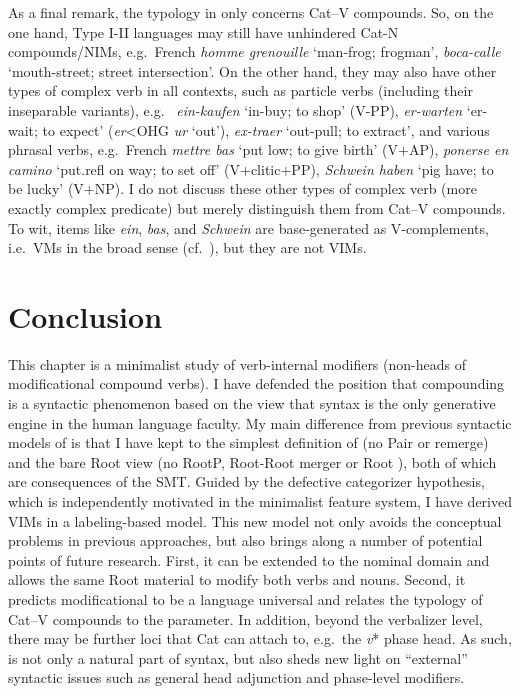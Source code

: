 \documentclass[output=paper]{langsci/langscibook}
\begin{document}
As a final remark, the typology in  only concerns Cat--V
compounds. So, on the one hand, Type I-II languages may still have unhindered
Cat-N compounds/N\glspl{IM}, e.g.\ French {\it homme grenouille} `man-frog;
frogman',  {\it boca-calle} `mouth-street; street intersection'. On the
other hand, they may also have other types of complex verb in all contexts,
such as particle verbs (including their inseparable variants), e.g.\ 
{\it ein-kaufen} `in-buy; to shop' (V-PP), {\it er-warten} `{\sc er}-wait; to
expect' ({\it er}<OHG {\it ur} `out'),  {\it ex-traer} `out-pull; to
extract', and various phrasal verbs, e.g.\ French {\it mettre bas} `put low; to
give birth' (V+AP),  {\it ponerse en camino} `put.{\sc refl} on way; to
set off' (V+clitic+PP),  {\it Schwein haben} `pig have; to be lucky'
(V+NP). I do not discuss these other types of complex verb (more exactly
complex predicate) but merely distinguish them from Cat--V compounds. To wit,
items like {\it ein}, {\it bas}, and {\it Schwein} are base-generated as
V-complements, i.e.\ \glspl{VM} in the broad sense (cf.\ ), but they
are not \glspl{VIM}.

\section{Conclusion}\label{sec6}

This chapter is a minimalist study of verb-internal modifiers (non-heads of
modificational compound verbs). I have defended the position that compounding
is a syntactic phenomenon based on the view that syntax is the only generative
engine in the human language faculty. My main difference from previous
syntactic models of  is that I have kept to the simplest definition
of  (no Pair  or remerge) and the bare Root view (no RootP, Root-Root
merger or Root ), both of which are consequences of the \gls{SMT}.
Guided by the defective categorizer hypothesis, which is independently
motivated in the minimalist feature system, I have derived \glspl{VIM} in a
labeling-based model. This new model not only avoids the conceptual problems in
previous approaches, but also brings along a number of potential points of
future research. First, it can be extended to the nominal domain and allows the
same Root material to modify both verbs and nouns. Second, it predicts
modificational  to be a language universal and relates the typology
of Cat--V compounds to the  parameter. In addition, beyond the
verbalizer level, there may be further loci that Cat can attach to, e.g.\ the
{\em v}* phase head. As such,  is not only a natural part of syntax,
but also sheds new light on ``external'' syntactic issues such as general head
adjunction and phase-level modifiers.
\end{document}
